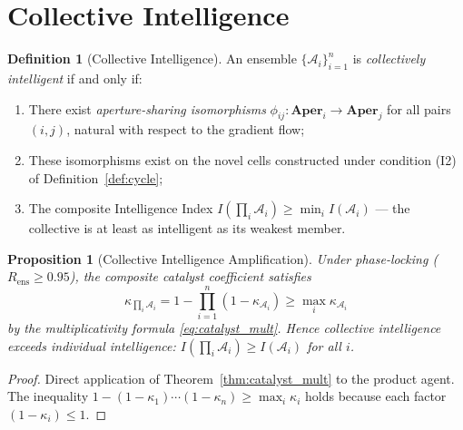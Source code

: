\documentclass[twocolumn,11pt,a4paper]{article}
\theoremstyle{plain}
\newtheorem{proposition}[theorem]{Proposition}
\theoremstyle{definition}
\newtheorem{definition}[theorem]{Definition}
\theoremstyle{remark}
\newcommand{\Aper}{\mathbf{Aper}}
\begin{document}
\section{Collective Intelligence}
\label{sec:collective}

\begin{definition}[Collective Intelligence]
\label{def:collective}
An ensemble $\{\mathcal{A}_i\}_{i=1}^n$ is \emph{collectively intelligent} if and only if:
\begin{enumerate}[label=(\roman*)]
  \item There exist \emph{aperture-sharing isomorphisms} $\phi_{ij} : \Aper_i \to \Aper_j$ for all pairs $(i,j)$, natural with respect to the gradient flow;
  \item These isomorphisms exist on the novel cells constructed under condition (I2) of Definition~\ref{def:cycle};
  \item The composite Intelligence Index $I(\prod_i \mathcal{A}_i) \ge \min_i I(\mathcal{A}_i)$ — the collective is at least as intelligent as its weakest member.
\end{enumerate}
\end{definition}

\begin{proposition}[Collective Intelligence Amplification]
\label{prop:amplification}
Under phase-locking ($R_\mathrm{ens} \ge 0.95$), the composite catalyst coefficient satisfies
\begin{equation}
  \kappa_{\prod_i \mathcal{A}_i} = 1 - \prod_{i=1}^n (1 - \kappa_{\mathcal{A}_i}) \ge \max_i \kappa_{\mathcal{A}_i}
\end{equation}
by the multiplicativity formula \eqref{eq:catalyst_mult}.  Hence collective intelligence exceeds individual intelligence: $I(\prod_i \mathcal{A}_i) \ge I(\mathcal{A}_i)$ for all $i$.
\end{proposition}

\begin{proof}
Direct application of Theorem~\ref{thm:catalyst_mult} to the product agent.  The inequality $1-(1-\kappa_1)\cdots(1-\kappa_n) \ge \max_i\kappa_i$ holds because each factor $(1-\kappa_i) \le 1$.
\end{proof}
\end{document}
